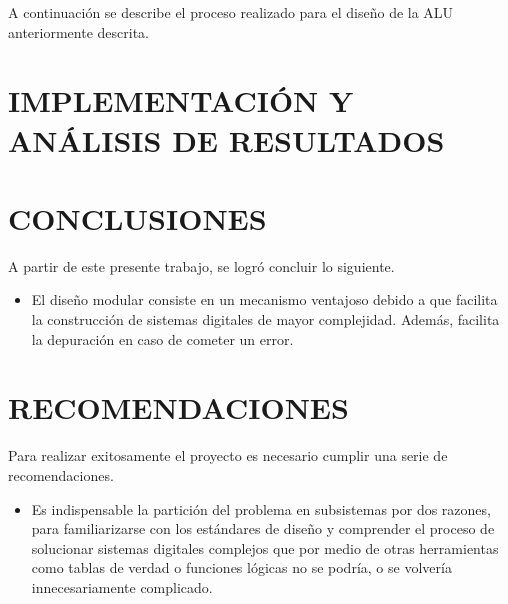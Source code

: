 \documentclass[journal,trans]{IEEEtran}
\begin{document}
A continuación se describe el proceso realizado para el diseño de la ALU anteriormente descrita.




\begin{comment}
Parte del problema por resolver consiste en el uso de componentes combinacionales, para lo cual se dispuso de un multiplexor de ocho entradas como el encargado de gobernar las operaciones.

se realizó una partición por módulos, lo cual consiste en estructurar la descripción del proyecto en secciones definidas, cada una con su respectivo proceso de diseño y codificación en el HDL Verilog.

Posteriormente se integró cada solución propuesta en un proyecto principal denominado main, al cual se le ajustaron los cambios correspondientes y se le agregó las distintas banderas como parte de las restricciones del proyecto.
\end{comment}

\section{IMPLEMENTACIÓN Y ANÁLISIS DE RESULTADOS}


\section{CONCLUSIONES}
A partir de este presente trabajo, se logró concluir lo siguiente.
\begin{itemize}
    \item El diseño modular consiste en un mecanismo ventajoso debido a que facilita la construcción de sistemas digitales de mayor complejidad. Además, facilita la depuración en caso de cometer un error.
\end{itemize}

\section{RECOMENDACIONES}
Para realizar exitosamente el proyecto es necesario cumplir una serie de recomendaciones.
\begin{itemize}
    \item Es indispensable la partición del problema en subsistemas por dos razones, para familiarizarse con los estándares de diseño y comprender el proceso de solucionar sistemas digitales complejos que por medio de otras herramientas como tablas de verdad o funciones lógicas no se podría, o se volvería innecesariamente complicado.
\end{itemize}
\end{document}
